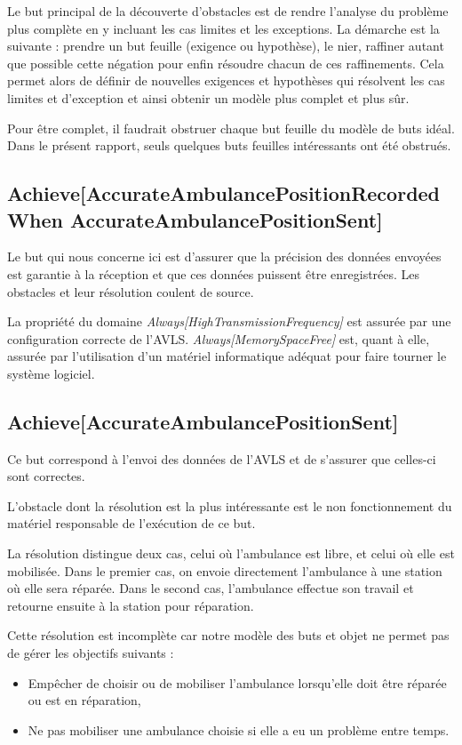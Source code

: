 Le but principal de la découverte d'obstacles est de rendre l'analyse du 
problème plus complète en y incluant les cas limites et les exceptions.  La 
démarche est la suivante : prendre un but feuille (exigence ou hypothèse), 
le nier, raffiner autant que possible cette négation pour enfin résoudre chacun 
de ces raffinements.  Cela permet alors de définir de nouvelles exigences et 
hypothèses qui résolvent les cas limites et d'exception et ainsi obtenir un 
modèle plus complet et plus sûr.

Pour être complet, il faudrait obstruer chaque but feuille du modèle de buts 
idéal.  Dans le présent rapport, seuls quelques buts feuilles intéressants ont 
été obstrués.

\subsection{Achieve[AccurateAmbulancePositionRecorded When AccurateAmbulancePositionSent]}
	Le but qui nous concerne ici est d'assurer que la précision des
	données envoyées est garantie à la réception et que ces données
	puissent être enregistrées. Les obstacles et leur résolution coulent 
	de source.
	
	La propriété du domaine \emph{Always[HighTransmissionFrequency]} est assurée 
	par une configuration correcte de l'AVLS.  \emph{Always[\-MemorySpaceFree]} 
	est, quant à elle, assurée par l'utilisation d'un matériel informatique 
	adéquat pour faire tourner le système logiciel. 

\subsection{Achieve[AccurateAmbulancePositionSent]}
	Ce but correspond à l'envoi des données de l'AVLS et de s'assurer
	que celles-ci sont correctes. 

	L'obstacle dont la résolution est la plus intéressante est le non
	fonctionnement du matériel responsable de l'exécution de ce but.

	La résolution distingue deux cas, celui où l'ambulance est libre, et celui
	où elle est mobilisée. Dans le premier cas, on envoie directement
	l'ambulance à une station où elle sera réparée. Dans le second
	cas, l'ambulance effectue son travail et retourne ensuite à la 
	station pour réparation.

	Cette résolution est incomplète car notre modèle des buts et objet
	ne permet pas de gérer les objectifs suivants : 
	\begin{itemize}
		\item Empêcher de choisir ou de mobiliser l'ambulance lorsqu'elle
		doit être réparée ou est en réparation,
		\item Ne pas mobiliser une ambulance choisie si elle a eu un
		problème entre temps.
	\end{itemize}


